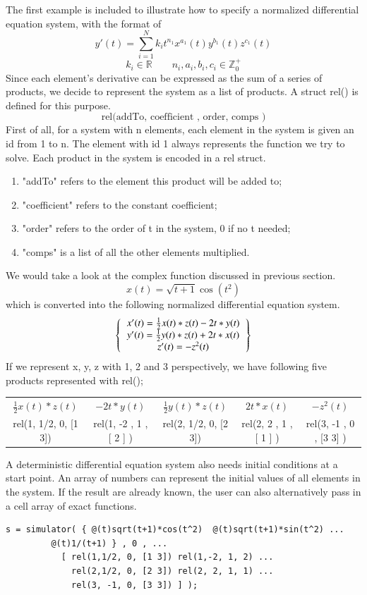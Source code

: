 \documentclass[12pt]{article}
\begin{document}
The first example is included to illustrate how to specify a normalized differential equation system, with the format of 
$$
y'(t) = \sum^N_{i=1} k_{i} t^{n_{1}} x^{a_{1}}(t) y^{b_{1}}(t) z^{c_{1}}(t) 
$$
$$
k_i \in \mathbb{R} \qquad n_i, a_i, b_i, c_i \in \mathbb{Z}^+_0
$$
Since each element's derivative can be expressed as the sum of a series of products, we decide to represent the system as a list of products. A struct rel() is defined for this purpose.
$$ \text{rel(addTo, coefficient , order, comps )}$$
First of all, for a system with n elements, each element in the system is given an id from 1 to n. The element with id 1 always represents the function we try to solve. Each product in the system is encoded in a rel struct.
\begin{enumerate}
\item "addTo" refers to the element this product will be added to;
\item "coefficient" refers to the constant coefficient;
\item "order" refers to the order of t in the system, 0 if no t needed; 
\item "comps" is a list of all the other elements multiplied.
\end{enumerate}
We would take a look at the complex function discussed in previous section.
\begin{equation}
x(t) = \sqrt{t+1}\cos(t^2)
\end{equation}
which is converted into the following normalized differential equation system.
\[
\left \{
  \begin{tabular}{ccc}
  $x'(t) = \frac{1}{2}x(t)*z(t) - 2t*y(t)$ \\
  $y'(t) = \frac{1}{2}y(t)*z(t) + 2t*x(t)$ \\
  $z'(t) = -z^{2}(t)$
  \end{tabular}
\right \}
\]
If we represent x, y, z with 1, 2 and 3 perspectively, we have following five products represented with rel();

\vspace{0.3cm}
\begin{tabular}{ccccc}
  $\frac{1}{2}x(t)*z(t)$  &  $- 2t*y(t)$ &
  $\frac{1}{2}y(t)*z(t)$ & $2t*x(t)$ & $-z^{2}(t)$ \\
  rel(1, 1/2, 0, [1 3]) & rel(1, -2 , 1 , [ 2 ] ) & 
  rel(2, 1/2, 0, [2 3]) & rel(2, 2 , 1 , [ 1 ] ) & rel(3, -1 , 0 , [3 3] )
\end{tabular}
\vspace{0.2cm}

A deterministic differential equation system also needs initial conditions at a start point. An array of numbers can represent the initial values of all elements in the system. If the result are already known, the user can also alternatively pass in a cell array of exact functions.
\begin{lstlisting}
s = simulator( { @(t)sqrt(t+1)*cos(t^2)  @(t)sqrt(t+1)*sin(t^2) ...
		 @(t)1/(t+1) } , 0 , ...
  	       [ rel(1,1/2, 0, [1 3]) rel(1,-2, 1, 2) ...
    		 rel(2,1/2, 0, [2 3]) rel(2, 2, 1, 1) ...
       		 rel(3, -1, 0, [3 3]) ] );
\end{lstlisting}
\end{document}
